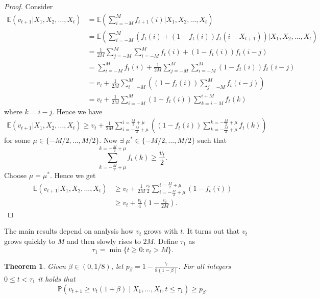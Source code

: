 \documentclass{article}
\newtheorem{theorem}{Theorem}
\begin{document}
\begin{proof}
Consider
\begin{align*}
    \mathbb{E}(v_{t+1}|X_1,X_2,\dots,X_t) &= \mathbb{E}\left(\sum_{i=-M}^M f_{t+1}(i)|X_1,X_2,\dots,X_t\right)\\
    &= \mathbb{E}\left(\sum_{i=-M}^M (f_{t}(i)+(1-f_t(i))f_t(i-X_{t+1}))|X_1,X_2,\dots,X_t\right)\\
    &= \frac{1}{2M}\sum_{j=-M}^M \sum_{i=-M}^M f_t(i)+(1-f_t(i))f_t(i-j)\\
    &= \sum_{i=-M}^M f_t(i)+\frac{1}{2M}\sum_{j=-M}^M \sum_{i=-M}^M (1-f_t(i))f_t(i-j)\\
    &= v_t+\frac{1}{2M} \sum_{i=-M}^M \left((1-f_t(i))\sum_{j=-M}^M f_t(i-j)\right)\\
    &= v_t+\frac{1}{2M} \sum_{i=-M}^M (1-f_t(i))\sum_{k=i-M}^{i+M}f_t(k)
    \end{align*}
where $k=i-j$. Hence we have
    \begin{align*}    
    \mathbb{E}(v_{t+1}|X_1,X_2,\dots,X_t) \geq v_t + \frac{1}{2M}\sum_{i=-\frac{M}{2}+\mu}^{i=\frac{M}{2}+\mu}\left((1-f_t(i))\sum_{k=-\frac{M}{2}+\mu}^{k=-\frac{M}{2}+\mu}f_t(k)\right)
\end{align*}
for some $\mu\in \{-M/2,\dots,M/2\}$. Now $\exists\; \mu^*\in \{-M/2,\dots,M/2\}$ such that
\begin{equation*}
    \sum_{k=-\frac{M}{2}+\mu}^{k=-\frac{M}{2}+\mu}f_t(k)\geq \frac{v_t}{2}.
\end{equation*}
Choose $\mu=\mu^*$. Hence we get
\begin{align*}
    \mathbb{E}(v_{t+1}|X_1,X_2,\dots,X_t) &\geq v_t + \frac{1}{2M}\frac{v_t}{2}\sum_{i=-\frac{M}{2}+\mu}^{i=\frac{M}{2}+\mu}\left(1-f_t(i)\right)\\
    &\geq v_t+\frac{v_t}{4}\left(1-\frac{v_t}{2M}\right).
\end{align*}
\end{proof}
\noindent The main results depend on analysis how $v_t$ grows with $t$. It turns out that $v_t$ grows quickly to $M$ and then slowly rises to $2M$. Define $\tau_1$ as
\begin{equation*}
    \tau_1 = \min \{t\geq 0: v_t>M\}.
\end{equation*}
\begin{theorem}
    \label{thm:pvt1}
    Given $\beta \in (0,1/8)$, let $p_\beta = 1-\frac{7}{8(1-\beta)}$. For all integers $0\leq t<\tau_1$ it holds that
    \begin{equation*}
        \mathbb{P}(v_{t+1}\geq v_t(1+\beta)\;|\;X_1,\dots,X_t,t\leq \tau_1)\geq p_\beta.
    \end{equation*}
\end{theorem}
\end{document}
